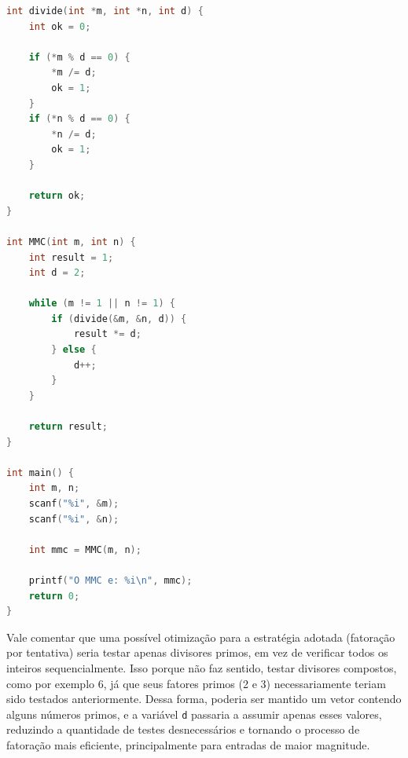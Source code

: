 \begin{lstlisting}[language=C, caption={Pseudocódigo em C do algoritmo}, label={lst:pseudocodigo}]
int divide(int *m, int *n, int d) {
    int ok = 0;

    if (*m % d == 0) {
        *m /= d;
        ok = 1;
    }
    if (*n % d == 0) {
        *n /= d;
        ok = 1;
    }

    return ok;
}

int MMC(int m, int n) {
    int result = 1;
    int d = 2;

    while (m != 1 || n != 1) {
        if (divide(&m, &n, d)) {
            result *= d;
        } else {
            d++;
        }
    }

    return result;
}

int main() {
    int m, n;
    scanf("%i", &m);
    scanf("%i", &n);

    int mmc = MMC(m, n);

    printf("O MMC e: %i\n", mmc);
    return 0;
}
\end{lstlisting}

Vale comentar que uma possível otimização para a estratégia adotada (fatoração por tentativa) seria testar apenas divisores primos, em vez de verificar todos os inteiros 
sequencialmente.
Isso porque não faz sentido, testar divisores compostos, como por exemplo 6, já que seus fatores primos
(2 e 3) necessariamente teriam sido testados anteriormente.
Dessa forma, poderia ser mantido um vetor
contendo alguns números primos, e a variável \texttt{d} passaria a assumir apenas esses valores, reduzindo a quantidade de testes 
desnecessários e tornando o processo de fatoração mais eficiente, principalmente para entradas de maior magnitude.